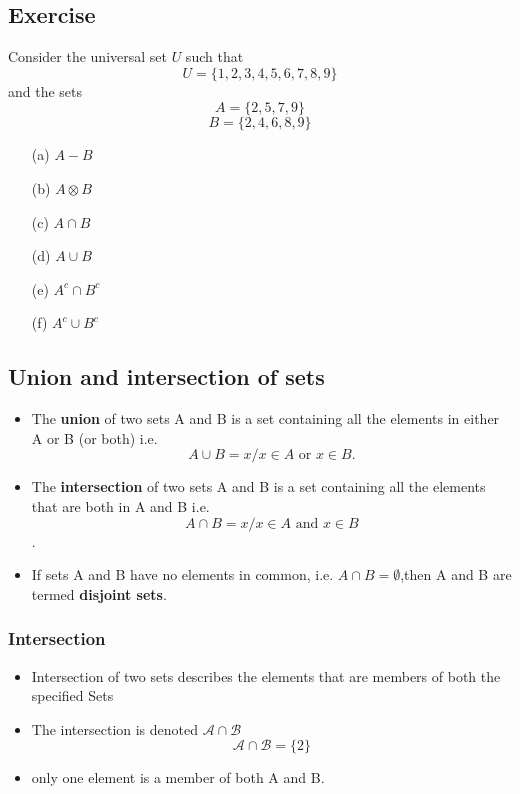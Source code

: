 \documentclass[11pt,a4paper,titlepage,oneside,openany]{article}
\numberwithin{equation}{section}
\numberwithin{algorithm}{section}
\numberwithin{figure}{section}
\numberwithin{table}{section}
\begin{document}
\subsection*{Exercise}
Consider the universal set $U$ such that
\[U=\{1,2,3,4,5,6,7,8,9\} \]
and the sets
\[A=\{2,5,7,9\} \]
\[B=\{2,4,6,8,9\} \]
\begin{multicols}{2}
\begin{itemize}
	\item[(a)] $A-B$
	\item[(b)] $A \otimes B$
	\item[(c)] $A \cap B$
	\item[(d)] $A \cup B$
	\item[(e)] $A^{c} \cap B^{c}$
	\item[(f)] $A^{c} \cup B^{c}$
\end{itemize}
\end{multicols}
\newpage
\subsection*{Union and intersection of sets}
\begin{itemize}
\item The \textbf{union} of two sets A and B is a set containing all the elements in
either A or B (or both)
i.e.
\[A \cup B = {x / x \in A \mbox{ or } x \in B}.\]
\item The \textbf{intersection} of two sets A and B is a set containing all the elements
that are both in A and B
i.e.
\[A \cap B = {x / x \in A \mbox{ and }x \in B}\].
\item If sets A and B have no elements in common, i.e. $A \cap B = \emptyset$,then A and B
are termed \textbf{disjoint sets}.
\end{itemize}
\newpage
\subsubsection*{Intersection}
\begin{itemize}
\item Intersection of two sets describes the elements that are members of both the specified Sets
\item The intersection is denoted $\mathcal{A\cap B}$
\[ \mathcal{A\cap B} = \{2\}\]
\item only one element is a member of both A and B.
\end{itemize}
\end{document}
